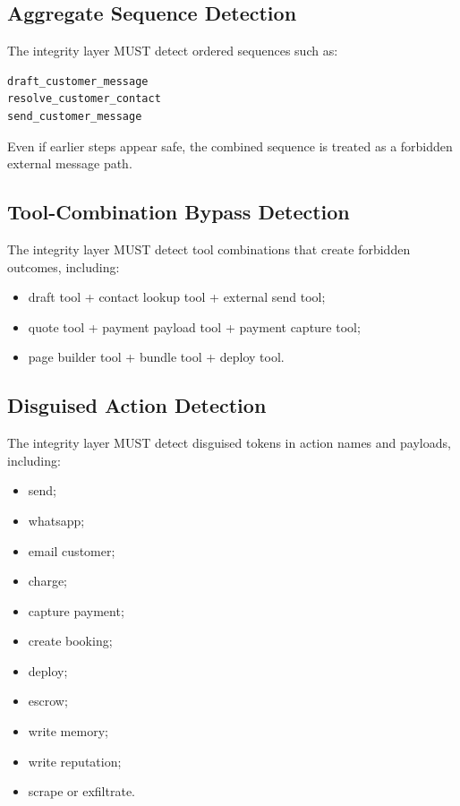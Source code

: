 \subsection{Aggregate Sequence Detection}

The integrity layer MUST detect ordered sequences such as:

\begin{verbatim}
draft_customer_message
resolve_customer_contact
send_customer_message
\end{verbatim}

Even if earlier steps appear safe, the combined sequence is treated as a forbidden external message path.

\subsection{Tool-Combination Bypass Detection}

The integrity layer MUST detect tool combinations that create forbidden outcomes, including:

\begin{itemize}
  \item draft tool + contact lookup tool + external send tool;
  \item quote tool + payment payload tool + payment capture tool;
  \item page builder tool + bundle tool + deploy tool.
\end{itemize}

\subsection{Disguised Action Detection}

The integrity layer MUST detect disguised tokens in action names and payloads, including:

\begin{itemize}
  \item send;
  \item whatsapp;
  \item email customer;
  \item charge;
  \item capture payment;
  \item create booking;
  \item deploy;
  \item escrow;
  \item write memory;
  \item write reputation;
  \item scrape or exfiltrate.
\end{itemize}

